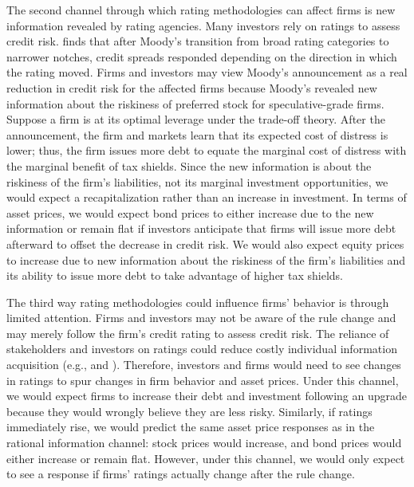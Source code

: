 \documentclass[a4paper, 12pt]{article}
\begin{document}
The second channel through which rating methodologies can affect firms is new information revealed by rating agencies. Many investors rely on ratings to assess credit risk. \cite{tang2009information} finds that after Moody's transition from broad rating categories to narrower notches, credit spreads responded depending on the direction in which the rating moved. Firms and investors may view Moody's announcement as a real reduction in credit risk for the affected firms because Moody's revealed new information about the riskiness of preferred stock for speculative-grade firms. Suppose a firm is at its optimal leverage under the trade-off theory. After the announcement, the firm and markets learn that its expected cost of distress is lower; thus, the firm issues more debt to equate the marginal cost of distress with the marginal benefit of tax shields. Since the new information is about the riskiness of the firm's liabilities, not its marginal investment opportunities, we would expect a recapitalization rather than an increase in investment. In terms of asset prices, we would expect bond prices to either increase due to the new information or remain flat if investors anticipate that firms will issue more debt afterward to offset the decrease in credit risk. We would also expect equity prices to increase due to new information about the riskiness of the firm's liabilities and its ability to issue more debt to take advantage of higher tax shields.

The third way rating methodologies could influence firms' behavior is through limited attention. Firms and investors may not be aware of the rule change and may merely follow the firm's credit rating to assess credit risk. The reliance of stakeholders and investors on ratings could reduce costly individual information acquisition (e.g., \cite{ramakrishnan1984information} and \cite{millon1985moral}). Therefore, investors and firms would need to see changes in ratings to spur changes in firm behavior and asset prices. Under this channel, we would expect firms to increase their debt and investment following an upgrade because they would wrongly believe they are less risky. Similarly, if ratings immediately rise, we would predict the same asset price responses as in the rational information channel: stock prices would increase, and bond prices would either increase or remain flat. However, under this channel, we would only expect to see a response if firms' ratings actually change after the rule change.
\end{document}
